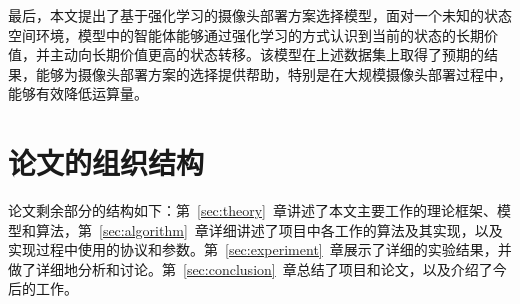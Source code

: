 最后，本文提出了基于强化学习的摄像头部署方案选择模型，面对一个未知的状态空间环境，模型中的智能体能够通过强化学习的方式认识到当前的状态的长期价值，并主动向长期价值更高的状态转移。该模型在上述数据集上取得了预期的结果，能够为摄像头部署方案的选择提供帮助，特别是在大规模摄像头部署过程中，能够有效降低运算量。

\section{论文的组织结构}

论文剩余部分的结构如下：第~\ref{sec:theory}~章讲述了本文主要工作的理论框架、模型和算法，第~\ref{sec:algorithm}~章详细讲述了项目中各工作的算法及其实现，以及实现过程中使用的协议和参数。第~\ref{sec:experiment}~章展示了详细的实验结果，并做了详细地分析和讨论。第~\ref{sec:conclusion}~章总结了项目和论文，以及介绍了今后的工作。